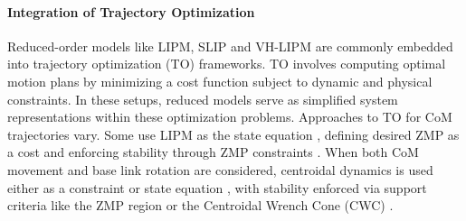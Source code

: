 \documentclass[main.tex]{subfiles}
\begin{document}
\paragraph{Integration of Trajectory Optimization} Reduced-order models like LIPM, SLIP and VH-LIPM are commonly embedded into trajectory optimization (TO) frameworks. TO involves computing optimal motion plans by minimizing a cost function subject to dynamic and physical constraints. In these setups, reduced models serve as simplified system representations within these optimization problems. Approaches to TO for CoM trajectories vary. Some use LIPM as the state equation \cite{englsberger2017smooth, kamioka2018simultaneous}, defining desired ZMP as a cost \cite{tedrake2015closed} and enforcing stability through ZMP constraints \cite{ajita2003biped, murooka2022centroidal}. When both CoM movement and base link rotation are considered, centroidal dynamics is used either as a constraint or state equation \cite{kuindersma2016optimization, rossini2023real}, with stability enforced via support criteria like the ZMP region or the Centroidal Wrench Cone (CWC) \cite{ding2021nonlinear, dai2016planning}.
\end{document}
